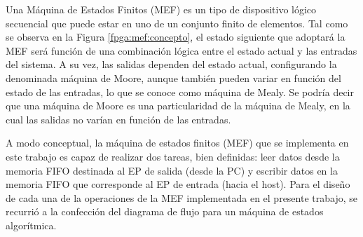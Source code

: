 Una Máquina de Estados Finitos (MEF) es un tipo de dispositivo lógico secuencial que puede estar en uno de un conjunto finito de elementos. Tal como se observa en la Figura \ref{fpga:mef:concepto}, el estado siguiente que adoptará la MEF será función de una combinación lógica entre el estado actual y las entradas del sistema. A su vez, las salidas dependen del estado actual, configurando la denominada máquina de Moore, aunque también pueden variar en función del estado de las entradas, lo que se conoce como máquina de Mealy\cite{Wakerly1999}. Se podría decir que una máquina de Moore es una particularidad de la máquina de Mealy, en la cual las salidas no varían en función de las entradas.

A modo conceptual, la máquina de estados finitos (MEF) que se implementa en este trabajo es capaz de realizar dos tareas, bien definidas: leer datos desde la memoria FIFO destinada al EP de salida (desde la PC) y escribir datos en la memoria FIFO que corresponde al EP de entrada (hacia el host). 
Para el diseño de cada una de la operaciones de la MEF implementada en el presente trabajo, se recurrió a la confección del diagrama de flujo para un máquina de estados algorítmica.




